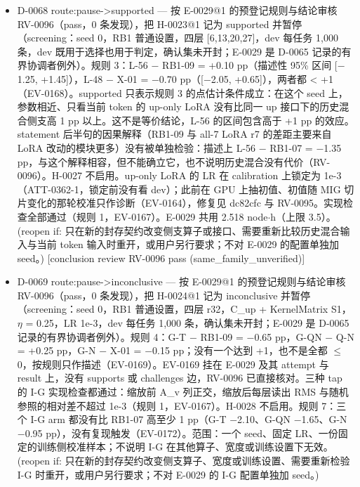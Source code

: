 \documentclass[11pt]{article}
\begin{document}
\begin{itemize}
\item D-0068 route:pause-\textgreater{}supported --- 按 E-0029@1 的预登记规则与结论审核 RV-0096（pass，0 条发现），把 H-0023@1 记为 supported 并暂停（screening：seed 0，RB1 普通设置，四层 [6,13,20,27]，dev 每任务 1,000 条，dev 既用于选择也用于判定，确认集未开封；E-0029 是 D-0065 记录的有界协调者例外）。规则 3：L-56 \ensuremath{-} RB1-09 = +0.10 pp（描述性 95\% 区间 [\ensuremath{-}1.25, +1.45]），L-48 \ensuremath{-} X-01 = \ensuremath{-}0.70 pp（[\ensuremath{-}2.05, +0.65]），两者都 \textless{} +1（EV-0168）。supported 只表示规则 3 的点估计条件成立：在这个 seed 上，参数相近、只看当前 token 的 up-only LoRA 没有比同一 up 接口下的历史混合侧支高 1 pp 以上。这不是等价结论，L-56 的区间包含高于 +1 pp 的效应。statement 后半句的因果解释（RB1-09 与 all-7 LoRA r7 的差距主要来自 LoRA 改动的模块更多）没有被单独检验：描述上 L-56 \ensuremath{-} RB1-07 = \ensuremath{-}1.35 pp，与这个解释相容，但不能确立它，也不说明历史混合没有代价（RV-0096）。H-0027 不启用。up-only LoRA 的 LR 在 calibration 上锁定为 1e-3（ATT-0362-1，锁定前没有看 dev）；此前在 GPU 上抽初值、初值随 MIG 切片变化的那轮校准只作诊断（EV-0164），修复见 dc82cfc 与 RV-0095。实现检查全部通过（规则 1，EV-0167）。E-0029 共用 2.518 node\ensuremath{\cdot}h（上限 3.5）。 (reopen if: 只在新的封存契约改变侧支算子或接口、需要重新比较历史混合输入与当前 token 输入时重开，或用户另行要求；不对 E-0029 的配置单独加 seed。) [conclusion review RV-0096 pass (same\_family\_unverified)]
\item D-0069 route:pause-\textgreater{}inconclusive --- 按 E-0029@1 的预登记规则与结论审核 RV-0096（pass，0 条发现），把 H-0024@1 记为 inconclusive 并暂停（screening：seed 0，RB1 普通设置，四层 r32，C\_up + KernelMatrix S1，\ensuremath{\eta} = 0.25，LR 1e-3，dev 每任务 1,000 条，确认集未开封；E-0029 是 D-0065 记录的有界协调者例外）。规则 4：G-T \ensuremath{-} RB1-09 = \ensuremath{-}0.65 pp，G-QN \ensuremath{-} Q-N = +0.25 pp，G-N \ensuremath{-} X-01 = \ensuremath{-}0.15 pp；没有一个达到 +1，也不是全都 \ensuremath{\leq} 0，按规则只作描述（EV-0169）。EV-0169 挂在 E-0029 及其 attempt 与 result 上，没有 supports 或 challenges 边，RV-0096 已直接核对。三种 tap 的 I-G 实现检查都通过：缩放前 A\_v 列正交，缩放后每层读出 RMS 与随机参照的相对差不超过 1e-3（规则 1，EV-0167）。H-0028 不启用。规则 7：三个 I-G arm 都没有比 RB1-07 高至少 1 pp（G-T \ensuremath{-}2.10、G-QN \ensuremath{-}1.65、G-N \ensuremath{-}0.95 pp），没有复现触发（EV-0172）。范围：一个 seed、固定 LR、一份固定的训练侧校准样本；不说明 I-G 在其他算子、宽度或训练设置下无效。 (reopen if: 只在新的封存契约改变侧支算子、宽度或训练设置、需要重新检验 I-G 时重开，或用户另行要求；不对 E-0029 的 I-G 配置单独加 seed。)

\end{itemize}
\end{document}
